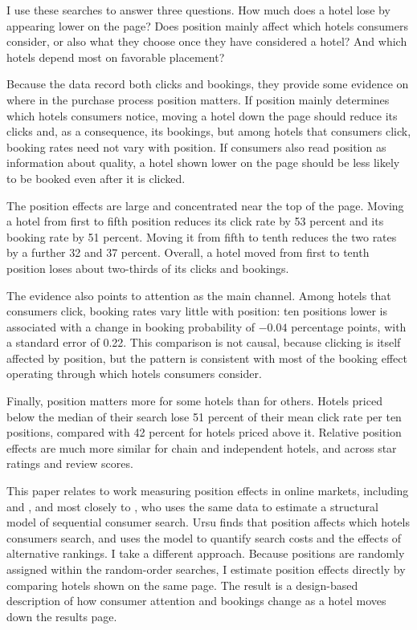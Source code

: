 \documentclass[12pt]{article}
\begin{document}
I use these searches to answer three questions. How much does a hotel lose by appearing lower on the page? Does position mainly affect which hotels consumers consider, or also what they choose once they have considered a hotel? And which hotels depend most on favorable placement?

Because the data record both clicks and bookings, they provide some evidence on where in the purchase process position matters. If position mainly determines which hotels consumers notice, moving a hotel down the page should reduce its clicks and, as a consequence, its bookings, but among hotels that consumers click, booking rates need not vary with position. If consumers also read position as information about quality, a hotel shown lower on the page should be less likely to be booked even after it is clicked.

The position effects are large and concentrated near the top of the page. Moving a hotel from first to fifth position reduces its click rate by 53 percent and its booking rate by 51 percent. Moving it from fifth to tenth reduces the two rates by a further 32 and 37 percent. Overall, a hotel moved from first to tenth position loses about two-thirds of its clicks and bookings.

The evidence also points to attention as the main channel. Among hotels that consumers click, booking rates vary little with position: ten positions lower is associated with a change in booking probability of $-0.04$ percentage points, with a standard error of 0.22. This comparison is not causal, because clicking is itself affected by position, but the pattern is consistent with most of the booking effect operating through which hotels consumers consider.

Finally, position matters more for some hotels than for others. Hotels priced below the median of their search lose 51 percent of their mean click rate per ten positions, compared with 42 percent for hotels priced above it. Relative position effects are much more similar for chain and independent hotels, and across star ratings and review scores.

This paper relates to work measuring position effects in online markets, including \citet{ghose2014examining} and \citet{narayanan2015position}, and most closely to \citet{ursu2018power}, who uses the same data to estimate a structural model of sequential consumer search. Ursu finds that position affects which hotels consumers search, and uses the model to quantify search costs and the effects of alternative rankings. I take a different approach. Because positions are randomly assigned within the random-order searches, I estimate position effects directly by comparing hotels shown on the same page. The result is a design-based description of how consumer attention and bookings change as a hotel moves down the results page.
\end{document}

